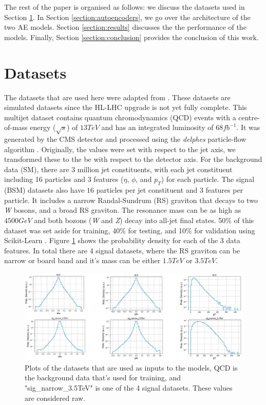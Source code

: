 \documentclass[a4paper]{article}
\theoremstyle{plain}
\theoremstyle{definition}
\begin{document}
	The rest of the paper is organised as follows: we discuss the datasets used in Section \ref{section:datasets}. In Section \ref{section:autoencoders}, we go over the architecture of the two AE models. Section \ref{section:results} discusses the the performance of the models. Finally, Section \ref{section:conclusion} provides the conclusion of this work.
	
	\section{Datasets}
	\label{section:datasets}

	The datasets that are used here were adapted from \cite{data}. These datasets are simulated datasets since the HL-LHC upgrade is not yet fully complete. This multijet dataset contains quantum chromodynamics (QCD) events with a centre-of-mass energy ($\sqrt{s}$) of $13 TeV$ and has an integrated luminosity of $68 fb^{-1}$. It was generated by the CMS detector and processed using the \textit{delphes} particle-flow algorithm \cite{delphes}. Originally, the values were set with respect to the jet axis, we transformed these to the be with respect to the detector axis. For the background data (SM), there are 3 million jet constituents, with each jet constituent including 16 particles and 3 features ($\eta$, $\phi$, and $p_T$) for each particle. The signal (BSM) datasets also have $16$ particles per jet constituent and 3 features per particle. It includes a narrow Randal-Sundrum (RS) graviton \cite{graviton} that decays to two \textit{W} bosons, and a broad RS graviton. The resonance mass can be as high as $4500 GeV$ and both bozons (\textit{W} and \textit{Z}) decay into all-jet final states. 50\% of this dataset was set aside for training, 40\% for testing, and 10\% for validation using Scikit-Learn \cite{scikit-learn}. Figure \ref{fig:data} shows the probability density for each of the 3 data features. In total there are 4 signal datasets, where the RS graviton can be narrow or board band and it's mass can be either $1.5 TeV$ or $3.5 TeV$. 

	\begin{figure}[H]
		\centering
		\begin{minipage}[b]{\linewidth}
			\centering
			\includegraphics[width=\textwidth]{data.png}
			\caption{Plots of the datasets that are used as inputs to the models, QCD is the background data that's used for training, and "sig\_narrow\_3.5TeV" is one of the 4 signal datasets. These values are considered raw.}
			\label{fig:data}
		\end{minipage}
	\end{figure}
	
\end{document}
